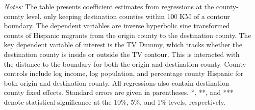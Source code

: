 \begin{table}[!h]
{\begin{threeparttable}
			\begin{tablenotes}[flushleft]
				\item \textit{Notes:} The table presents coefficient estimates from regressions at the county-county level, only keeping destination counties within 100 KM of a contour boundary. The dependent variables are inverse hyperbolic sine transformed counts of Hispanic migrants from the origin county to the destination county. The key dependent variable of interest is the TV Dummy, which tracks whether the destination county is inside or outside the TV contour. This is interacted with the distance to the boundary for both the origin and destination county. County controls include log income, log population, and percentage county Hispanic for both origin and destination county. All regressions also contain destination county fixed effects. Standard errors are given in parentheses. *, **, and *** denote statistical significance at the 10\%, 5\%, and 1\% levels, respectively.
			\end{tablenotes}
		\end{threeparttable}
	}
\end{table}